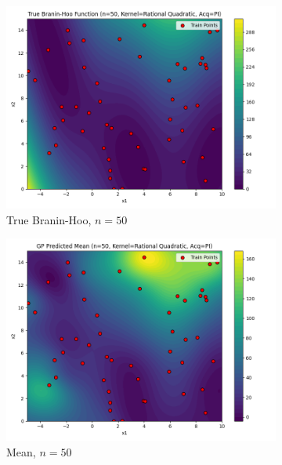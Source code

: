 \documentclass[a4paper,12pt]{article}
\begin{document}
\begin{figure}[H]
\begin{subfigure}{0.3\textwidth}
  \includegraphics[width=\linewidth]{Task-02/images/true_function_rational_quadratic_n50_PI.png}
  \caption{True Branin-Hoo, $n=50$}
\end{subfigure}
\begin{subfigure}{0.3\textwidth}
    \includegraphics[width=\linewidth]{Task-02/images/gp_mean_rational_quadratic_n50_PI.png}
    \caption{Mean, $n=50$}
\end{subfigure}
\begin{subfigure}{0.3\textwidth}

\end{subfigure}
\end{figure}
\end{document}
